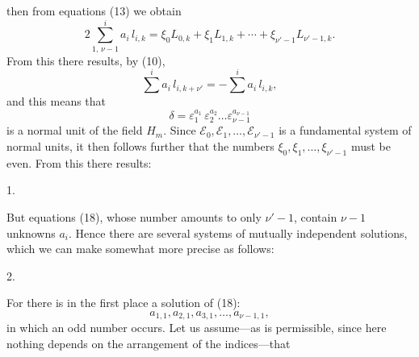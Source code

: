 
then from equations (13) we obtain
\[
2 \sum\limits_{1,\, \nu-1}^{i} a_i\, l_{i,k} = \xi_0 L_{0,k} + \xi_1 L_{1,k} + \cdots + \xi_{\nu'-1} L_{\nu'-1,k}.
\]
From this there results, by (10),
\[
\sum^{i} a_i\, l_{i,k+\nu'} = -\sum^{i} a_i\, l_{i,k},
\]
and this means that
\[
\delta = \varepsilon_1^{a_1}\, \varepsilon_2^{a_2} \ldots \varepsilon_{\nu-1}^{a_{\nu-1}}
\]
is a normal unit of the field $H_m$. Since $\mathcal{E}_0, \mathcal{E}_1, \ldots, \mathcal{E}_{\nu'-1}$
is a fundamental system of normal units, it then follows further that
 the numbers $\xi_0, \xi_1, \ldots, \xi_{\nu'-1}$ must be even. From this
there results:

1. 

But equations (18), whose number amounts to only $\nu'-1$, contain
$\nu-1$ unknowns $a_i$. Hence there are several systems of mutually
independent solutions, which we can make somewhat more precise
as follows:

2. 

For there is in the first place a solution of (18):
\[
a_{1,1}, a_{2,1}, a_{3,1}, \ldots, a_{\nu-1,1},
\]
in which an odd number occurs. Let us assume---as is permissible,
since here nothing depends on the arrangement of the indices---that
